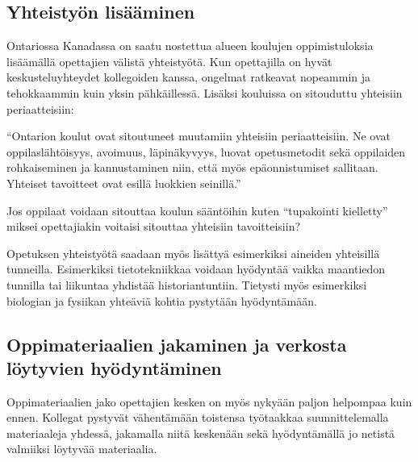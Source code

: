\documentclass[utf8,bachelor]{gradu3}
\begin{document}

\subsection{Yhteistyön lisääminen}
Ontariossa Kanadassa on saatu nostettua alueen koulujen oppimistuloksia lisäämällä opettajien välistä yhteistyötä. Kun opettajilla on hyvät keskusteluyhteydet kollegoiden kanssa, ongelmat ratkeavat nopeammin ja tehokkaammin kuin yksin pähkäillessä. Lisäksi kouluissa on sitouduttu yhteisiin periaatteisiin:

“Ontarion koulut ovat sitoutuneet muutamiin yhteisiin periaatteisiin. Ne ovat oppilaslähtöisyys, avoimuus, läpinäkyvyys, luovat opetusmetodit sekä oppilaiden rohkaiseminen ja kannustaminen niin, että myös epäonnistumiset sallitaan. Yhteiset tavoitteet ovat esillä luokkien seinillä.” \parencite[][]{KanadanMalli} 

Jos oppilaat voidaan sitouttaa koulun sääntöihin kuten “tupakointi kielletty” miksei opettajiakin voitaisi sitouttaa yhteisiin tavoitteisiin?

Opetuksen yhteistyötä saadaan myös lisättyä esimerkiksi aineiden yhteisillä tunneilla. Esimerkiksi tietotekniikkaa voidaan hyödyntää vaikka maantiedon tunnilla tai liikuntaa yhdistää historiantuntiin. Tietysti myös esimerkiksi biologian ja fysiikan yhteäviä kohtia pystytään hyödyntämään.


\subsection{Oppimateriaalien jakaminen ja verkosta löytyvien hyödyntäminen}
Oppimateriaalien jako opettajien kesken on myös nykyään paljon helpompaa kuin ennen. Kollegat pystyvät vähentämään toistensa työtaakkaa suunnittelemalla materiaaleja yhdessä, jakamalla niitä keskenään sekä hyödyntämällä jo netistä valmiiksi löytyvää materiaalia.

\end{document}
